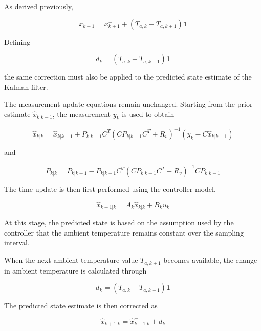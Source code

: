 As derived previously,

\begin{equation}
    x_{k+1}
    =
    x_{k+1}^{-}
    +
    \left(
        T_{a,k}-T_{a,k+1}
    \right)\mathbf{1}
\end{equation}

Defining

\begin{equation}
    d_k
    =
    \left(
        T_{a,k}-T_{a,k+1}
    \right)\mathbf{1}
\end{equation}

the same correction must also be applied to the predicted state estimate of
the Kalman filter.

The measurement-update equations remain unchanged. Starting from the prior
estimate \(\hat{x}_{k|k-1}\), the measurement \(y_k\) is used to obtain

\begin{equation}
    \hat{x}_{k|k}
    =
    \hat{x}_{k|k-1}
    +
    P_{k|k-1}C^T
    \left(
        CP_{k|k-1}C^T+R_v
    \right)^{-1}
    \left(
        y_k-C\hat{x}_{k|k-1}
    \right)
\end{equation}

and

\begin{equation}
    P_{k|k}
    =
    P_{k|k-1}
    -
    P_{k|k-1}C^T
    \left(
        CP_{k|k-1}C^T+R_v
    \right)^{-1}
    CP_{k|k-1}
\end{equation}

The time update is then first performed using the controller model,

\begin{equation}
    \hat{x}_{k+1|k}^{-}
    =
    A_k\hat{x}_{k|k}
    +
    B_ku_k
\end{equation}

At this stage, the predicted state is based on the assumption used by the
controller that the ambient temperature remains constant over the sampling
interval.

When the next ambient-temperature value \(T_{a,k+1}\) becomes available, the
change in ambient temperature is calculated through

\begin{equation}
    d_k
    =
    \left(
        T_{a,k}-T_{a,k+1}
    \right)\mathbf{1}
\end{equation}

The predicted state estimate is then corrected as

\begin{equation}
    \boxed{
    \hat{x}_{k+1|k}
    =
    \hat{x}_{k+1|k}^{-}
    +
    d_k
    }
\end{equation}

